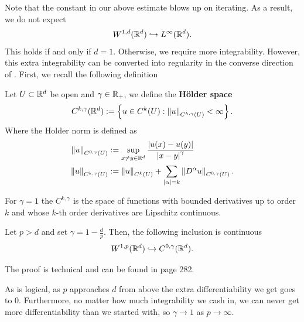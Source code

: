 \documentclass[
    a4paper,
    DIV=14,
    abstract=true,
    numbers=noenddot
]{scrartcl}
\begin{document}
Note that the constant in our above estimate blows up on iterating. As a result, we do not expect
\begin{align*}
	W^{1,d}(\mathbb{R}^d) \hookrightarrow L^\infty(\mathbb{R}^d).
\end{align*}
This holds if and only if $d=1$. Otherwise, we require more integrability. However, this extra integrability can be converted into regularity in the converse direction of . First, we recall the following definition
\begin{definition}\label{holder def}
	Let $U \subset \mathbb{R}^d$ be open and $\gamma \in \mathbb{R}_+$, we define the \textbf{Hölder space}
	\begin{align*}
		C^{k,\gamma }(\mathbb{R}^d):= \left\{u \in C^k(U): \left\lVert u \right\rVert_{C^{k,\gamma }(U)}<\infty\right\} .
	\end{align*}
	Where the Holder norm is defined as
	\begin{align*}
		\left\lVert u \right\rVert_{C^{0,\gamma }(U)} & := \sup_{x \neq y \in \mathbb{R}^d} \frac{{\left| u(x)-u(y) \right|} }{{\left| x-y \right|}^\gamma  }                \\
		\left\lVert u \right\rVert_{C^{k,\gamma }(U)} & :=\left\lVert u \right\rVert_{C^{k}(U)}+\sum_{{\left| \alpha \right|}= k } \left\lVert D^\alpha u \right\rVert_{C^{0,\gamma }(U)}   .
	\end{align*}
\end{definition}
For $\gamma =1$ the $C^{k,\gamma }$ is the space of functions with bounded derivatives up to order $k$ and whose $k$-th order derivatives are Lipschitz continuous.


\begin{theorem}[Morrey]\label{est3}
	Let $p>d$ and set $\gamma=1-\frac{d}{p}$. Then, the following inclusion is continuous
	\begin{align*}
		W^{1,p}(\mathbb{R}^d) \hookrightarrow C^{0,\gamma }(\mathbb{R}^d).
	\end{align*}


\end{theorem}
The proof is technical and can be found in \cite{brezis2011functional} page 282.

As is logical, as $p$ approaches  $d$ from above the extra differentiability we get goes to  $0$. Furthermore, no matter how much integrability we cash in, we can never get more differentiability than we started with, so $\gamma \to 1$ as $p \to \infty$.
\end{document}
